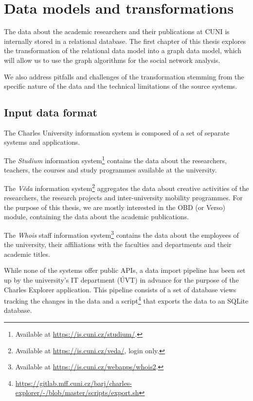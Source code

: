 \chapter{Data models and transformations}

The data about the academic researchers and their publications at CUNI is internally stored in a relational database. 
The first chapter of this thesis explores the transformation of the relational data model into a graph data model, 
which will allow us to use the graph algorithms for the social network analysis.

We also address pitfalls and challenges of the transformation stemming 
from the specific nature of the data and the technical limitations of the source systems.

\section{Input data format}

The Charles University information system is composed of a set of separate systems and applications.

The \textit{Studium} information system\footnote{Available at \url{https://is.cuni.cz/studium/}.} contains the data about the researchers, teachers, the courses and study programmes available at the university.

The \textit{Věda} information system\footnote{Available at \url{https://is.cuni.cz/veda/}, login only.} aggregates the data about creative activities of the researchers, the research projects and inter-university mobility programmes.
For the purpose of this thesis, we are mostly interested in the OBD (or Verso) module, containing the data about the academic publications.

The \textit{Whois} staff information system\footnote{Available at \url{https://is.cuni.cz/webapps/whois2}.} contains the data about the employees of the university, 
their affiliations with the faculties and departments and their academic titles.

While none of the systems offer public APIs, a data import pipeline has been set up by the university's IT department (ÚVT) in advance
for the purpose of the Charles Explorer application. 
This pipeline consists of a set of database views tracking the changes in the data and a script\footnote{\url{https://gitlab.mff.cuni.cz/barj/charles-explorer/-/blob/master/scripts/export.sh}} that exports the data to an SQLite database.

\newpage

